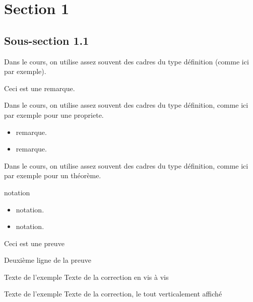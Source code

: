 \documentclass[nocrop]{sesamanuel}
\begin{document}
\cours
\section{Section 1}
\subsection{Sous-section 1.1}
\begin{definition}
  Dans le cours, on utilise assez souvent des cadres du type
  définition (comme ici par exemple).
\end{definition}
\begin{remarque}
  Ceci est une remarque.
\end{remarque}
\begin{propriete}
  Dans le cours, on utilise assez souvent des cadres du type
  définition, comme ici par exemple pour une propriete.
\end{propriete}
\begin{remarques}
  \begin{itemize}
    \item remarque.
    \item remarque.
  \end{itemize}
\end{remarques}
\begin{theoreme}
  Dans le cours, on utilise assez souvent des cadres du type
  définition, comme ici par exemple pour un théorème.
\end{theoreme}
\begin{notation}
  notation
\end{notation}
\begin{notations}
  \begin{itemize}
    \item notation.
    \item notation.
  \end{itemize}
\end{notations}
\begin{preuve}
  Ceci est une preuve\par Deuxième ligne de la preuve
\end{preuve}
\begin{exemple}
  Texte de l’exemple
  \correction
  Texte de la correction en vis à vis
\end{exemple}

\begin{exemple*1}
  Texte de l’exemple
  \correction
  Texte de la correction, le tout verticalement affiché
\end{exemple*1}
\end{document}
